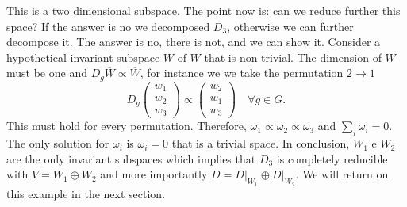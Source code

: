 \documentclass[12pt]{book}
\theoremstyle{plain}
\theoremstyle{definition}
\theoremstyle{remark}
\begin{document}
This is a two dimensional subspace. The point now is: can we reduce further this space? If the answer is no we decomposed $D_3$, otherwise we can further decompose it. The answer is no, there is not, and we can show it. Consider a hypothetical invariant subspace $\overline{W}$ of $W$ that is non trivial. The dimension of $\overline{W}$ must be one and $D_g\overline{W}\propto \overline{W}$, for instance we we take the permutation $2\to1$
\[D_g \begin{pmatrix}w_1\\w_2\\w_3\end{pmatrix} \propto \begin{pmatrix}w_2\\w_1\\w_3\end{pmatrix}\quad \forall g\in G.\]
This must hold for every permutation. Therefore, $\omega_1 \propto \omega_2\propto \omega_3$ and $\sum_i \omega_i = 0$. The only solution for $\omega_i$ is $\omega_i =0$ that is a trivial space. In conclusion, $W_1$ e $W_2$ are the only invariant subspaces which implies that $D_3$ is completely reducible with $V = W_1 \oplus W_2$ and more importantly $D = D\big|_{W_1} \oplus D\big|_{W_2}$. We will return on this example in the next section.
\end{document}
